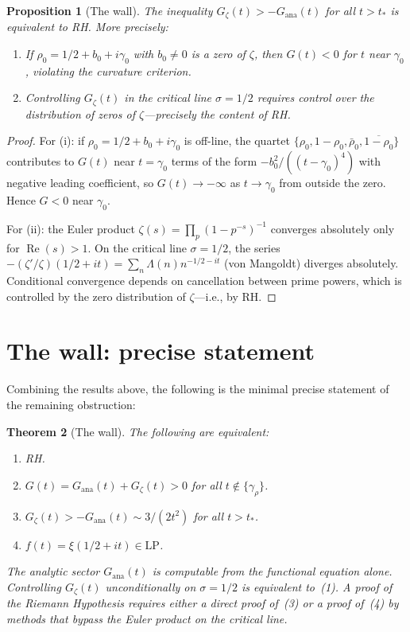 \documentclass[11pt]{amsart}
\newtheorem{theorem}{Theorem}[section]
\newtheorem{proposition}[theorem]{Proposition}
\renewcommand{\Re}{\operatorname{Re}}
\newcommand{\LP}{\mathrm{LP}}
\begin{document}
\begin{proposition}[The wall]\label{prop:wall}
The inequality $G_\zeta(t) > -G_{\mathrm{ana}}(t)$ for all $t > t_*$ is equivalent to RH.
More precisely:
\begin{enumerate}
  \item[\rm(i)] If $\rho_0 = 1/2 + b_0 + i\gamma_0$ with $b_0 \neq 0$ is a zero of $\zeta$, then
    $G(t) < 0$ for $t$ near $\gamma_0$, violating the curvature criterion.
  \item[\rm(ii)] Controlling $G_\zeta(t)$ in the critical line $\sigma = 1/2$ requires control
    over the distribution of zeros of $\zeta$---precisely the content of RH.
\end{enumerate}
\end{proposition}

\begin{proof}
For (i): if $\rho_0 = 1/2+b_0+i\gamma_0$ is off-line, the quartet
$\{\rho_0, 1-\rho_0, \bar\rho_0, \overline{1-\rho_0}\}$ contributes to $G(t)$ near $t = \gamma_0$
terms of the form $-b_0^2/((t-\gamma_0)^4)$ with negative leading coefficient, so
$G(t) \to -\infty$ as $t \to \gamma_0$ from outside the zero.  Hence $G < 0$ near $\gamma_0$.

For (ii): the Euler product $\zeta(s) = \prod_p(1-p^{-s})^{-1}$ converges absolutely only
for $\Re(s) > 1$.  On the critical line $\sigma = 1/2$, the series
$-(\zeta'/\zeta)(1/2+it) = \sum_n \Lambda(n)n^{-1/2-it}$ (von Mangoldt) diverges absolutely.
Conditional convergence depends on cancellation between prime powers, which is controlled
by the zero distribution of $\zeta$---i.e., by RH.
\end{proof}

\section{The wall: precise statement}
\label{sec:wall}

Combining the results above, the following is the minimal precise statement of the
remaining obstruction:

\begin{theorem}[The wall]\label{thm:wall}
The following are equivalent:
\begin{enumerate}
  \item[\rm(1)] RH.
  \item[\rm(2)] $G(t) = G_{\mathrm{ana}}(t) + G_\zeta(t) > 0$ for all $t \notin \{\gamma_\rho\}$.
  \item[\rm(3)] $G_\zeta(t) > -G_{\mathrm{ana}}(t) \sim 3/(2t^2)$ for all $t > t_*$.
  \item[\rm(4)] $f(t) = \xi(1/2+it) \in \LP$.
\end{enumerate}
The analytic sector $G_{\mathrm{ana}}(t)$ is computable from the functional equation alone.
Controlling $G_\zeta(t)$ unconditionally on $\sigma = 1/2$ is equivalent to~\rm{(1)}.
A proof of the Riemann Hypothesis requires either a direct proof of~\rm{(3)} or a proof
of~\rm{(4)} by methods that bypass the Euler product on the critical line.
\end{theorem}
\end{document}
